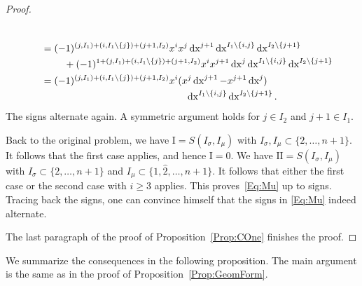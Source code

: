 \documentclass[\MainFolder/Text.tex]{subfiles}
\begin{document}
\begin{proof}
\begin{description}[font=\normalfont\itshape]
\begin{align*}
\begin{multlined}[t]
\end{multlined}\\&\quad=
\begin{multlined}[t]
(-1)^{(j,I_1) + (i,I_1\backslash\{j\})+(j+1,I_2)} x^i x^j \Diff{x}^{j+1} \Diff{x}^{I_1\backslash\{i,j\}} \Diff{x}^{I_2\backslash\{j+1\}} \\ {}+ (-1)^{1 + (j,I_1) + (i,I_1\backslash\{j\})+(j+1,I_2)} x^i x^{j+1} \Diff{x}^j \Diff{x}^{I_1\backslash\{i,j\}} \Diff{x}^{I_2\backslash\{j+1\}} 
\end{multlined}\\
&\quad= \begin{multlined}[t] (-1)^{(j,I_1) + (i,I_1\backslash\{j\})+(j+1,I_2)} x^i (x^j \Diff{x}^{j+1} - x^{j+1} \Diff{x}^j) \\ \Diff{x}^{I_1\backslash\{i,j\}} \Diff{x}^{I_2\backslash\{j+1\}}. \end{multlined}
\end{align*}
The signs alternate again.
A symmetric argument holds for $j\in I_2$ and $j+1\in I_1$.
\end{description}	 

 Back to the original problem, we have $\mathrm{I} = S(I_\sigma, I_\mu)$ with $I_\sigma, I_\mu \subset \{2,\dotsc, n+1\}$.
 It follows that the first case applies, and hence $\mathrm{I} = 0$. 
 We have $\mathrm{II} = S(I_\sigma, I_\mu)$ with $I_\sigma \subset \{2,\dotsc, n+1\}$ and $I_\mu \subset \{1, \widehat{2}, \dotsc, n+1\}$.
 It follows that either the first case or the second case with $i\ge 3$ applies.
 This proves~\eqref{Eq:Mu} up to signs.
 Tracing back the signs, one can convince himself that the signs in \eqref{Eq:Mu} indeed alternate.

The last paragraph of the proof of Proposition~\ref{Prop:COne} finishes the proof.
\end{proof}

We summarize the consequences in the following proposition.
The main argument is the same as in the proof of Proposition~\eqref{Prop:GeomForm}.
\end{document}
